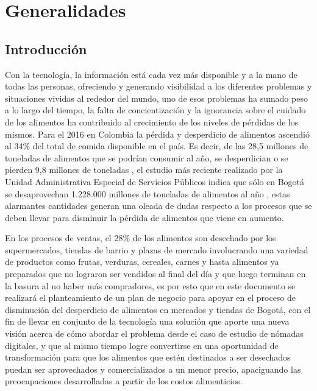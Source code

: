 \section{Generalidades}

\subsection{Introducción}

Con la tecnología, la información está cada vez más disponible y a la mano de todas las personas, ofreciendo y generando visibilidad a los diferentes problemas y situaciones vividas al rededor del mundo, uno de esos problemas ha sumado peso a lo largo del tiempo, la falta de concientización y la ignorancia sobre el cuidado de los alimentos ha contribuido al crecimiento de los niveles de pérdidas de los mismos. Para el 2016 en Colombia la pérdida y desperdicio de alimentos ascendió al 34\% del total de comida disponible en el país. Es decir, de las 28,5 millones de toneladas de alimentos que se podrían consumir al año, se desperdician o se pierden 9,8 millones de toneladas \cite{DNP}, el estudio más reciente realizado por la Unidad Administrativa Especial de Servicios Públicos indica que sólo en Bogotá se desaprovechan 1.228.000 millones de toneladas de alimentos al año \cite{UAESP}, estas alarmantes cantidades generan una oleada de dudas respecto a los procesos que se deben llevar para disminuir la pérdida de alimentos que viene en aumento.

En los procesos de ventas, el 28\% de los alimentos son desechado por los supermercados, tiendas de barrio y plazas de mercado \cite{DNP} involucrando una variedad de productos como frutas, verduras, cereales, carnes y hasta alimentos ya preparados que no lograron ser vendidos al final del día y que luego terminan en la basura al no haber más compradores, es por esto que en este documento se realizará el planteamiento de un plan de negocio para apoyar en el proceso de disminución del desperdicio de alimentos en mercados y tiendas de Bogotá, con el fin de llevar en conjunto de la tecnología una solución que aporte una nueva visión acerca de cómo abordar el problema desde el caso de estudio de nómadas digitales, y que al mismo tiempo logre convertirse en una oportunidad de transformación para que los alimentos 
que estén destinados a ser desechados puedan ser aprovechados y comercializados a un menor precio, apaciguando las preocupaciones desarrolladas a partir de los costos alimenticios.
\newpage